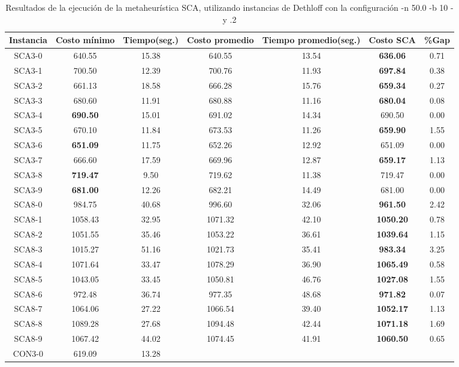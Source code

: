 \begin{table}[ht]
\caption{Resultados de la ejecución de la metaheurística SCA, utilizando instancias de Dethloff con la configuración -n 50.0 -b 10 -y .2}
\centering
\small
\begin{tabular}{c c c c c c c}
\hline\hline
Instancia & Costo mínimo & Tiempo(seg.) & Costo promedio & Tiempo promedio(seg.) & Costo SCA & \%Gap \\ [0.5ex]
\hline
SCA3-0 & 640.55 & 15.38 & 
640.55 & 13.54 & \bf{636.06} & 
0.71\\SCA3-1 & 700.50 & 12.39 & 
700.76 & 11.93 & \bf{697.84} & 
0.38\\SCA3-2 & 661.13 & 18.58 & 
666.28 & 15.76 & \bf{659.34} & 
0.27\\SCA3-3 & 680.60 & 11.91 & 
680.88 & 11.16 & \bf{680.04} & 
0.08\\SCA3-4 & \bf{690.50} & 15.01 & 
691.02 & 14.34 & 690.50 & 0.00\\
SCA3-5 & 670.10 & 11.84 & 
673.53 & 11.26 & \bf{659.90} & 
1.55\\SCA3-6 & \bf{651.09} & 11.75 & 
652.26 & 12.92 & 651.09 & 0.00\\
SCA3-7 & 666.60 & 17.59 & 
669.96 & 12.87 & \bf{659.17} & 
1.13\\SCA3-8 & \bf{719.47} & 9.50 & 
719.62 & 11.38 & 719.47 & 0.00\\
SCA3-9 & \bf{681.00} & 12.26 & 
682.21 & 14.49 & 681.00 & 0.00\\
SCA8-0 & 984.75 & 40.68 & 
996.60 & 32.06 & \bf{961.50} & 
2.42\\SCA8-1 & 1058.43 & 32.95 & 
1071.32 & 42.10 & \bf{1050.20} & 
0.78\\SCA8-2 & 1051.55 & 35.46 & 
1053.22 & 36.61 & \bf{1039.64} & 
1.15\\SCA8-3 & 1015.27 & 51.16 & 
1021.73 & 35.41 & \bf{983.34} & 
3.25\\SCA8-4 & 1071.64 & 33.47 & 
1078.29 & 36.90 & \bf{1065.49} & 
0.58\\SCA8-5 & 1043.05 & 33.45 & 
1050.81 & 46.76 & \bf{1027.08} & 
1.55\\SCA8-6 & 972.48 & 36.74 & 
977.35 & 48.68 & \bf{971.82} & 
0.07\\SCA8-7 & 1064.06 & 27.22 & 
1066.54 & 39.40 & \bf{1052.17} & 
1.13\\SCA8-8 & 1089.28 & 27.68 & 
1094.48 & 42.44 & \bf{1071.18} & 
1.69\\SCA8-9 & 1067.42 & 44.02 & 
1074.45 & 41.91 & \bf{1060.50} & 
0.65\\CON3-0 & 619.09 & 13.28 & 

\end{tabular}
\end{table}
